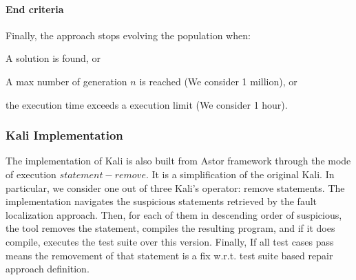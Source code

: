 \documentclass[11pt]{article} %
\begin{document}
\paragraph{End criteria}
Finally, the approach stops evolving the population when:
\begin{inparaenum}
\item A solution is found, or
\item A max number of generation $n$ is reached (We consider 1 million), or
\item the execution time exceeds a execution limit (We consider 1 hour). 
\end{inparaenum}




\subsubsection{Kali Implementation}

The implementation of Kali is also built from Astor framework through the  mode of execution $statement-remove$. 
It is a simplification of the original Kali.
In particular, we consider one out of three Kali's operator: remove statements.
The implementation navigates the suspicious statements retrieved by the fault localization approach.
Then, for each of them in descending order of suspicious, the tool removes the statement, compiles the resulting program, and if it does compile, executes the test suite over this version.
Finally, If all test cases pass means the removement of that statement is a fix w.r.t. test suite based repair approach definition. 



\end{document}
